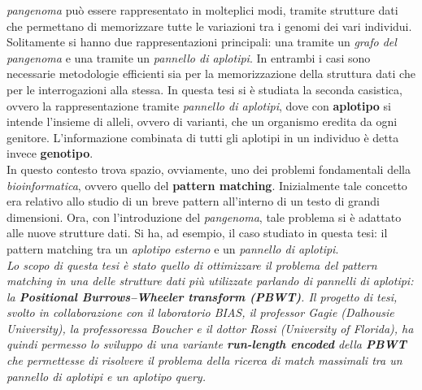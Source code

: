 \documentclass[a4paper,11pt, oneside]{article}
\begin{document}
\textit{pangenoma} può essere rappresentato in molteplici modi, tramite
strutture dati che permettano di memorizzare tutte le variazioni tra i genomi
dei vari individui. Solitamente si hanno due rappresentazioni principali: una
tramite un \textit{grafo del pangenoma} e una tramite un \textit{pannello di
  aplotipi}. In entrambi i casi sono necessarie metodologie efficienti sia per
la memorizzazione della struttura dati che per le interrogazioni alla stessa. In
questa tesi si è studiata la seconda casistica, ovvero la rappresentazione
tramite \textit{pannello di aplotipi}, dove con \textbf{aplotipo} si intende
l'insieme di alleli, ovvero di varianti, che un organismo eredita da ogni
genitore. L'informazione combinata di tutti gli aplotipi in un individuo è detta
invece \textbf{genotipo}.\\
In questo contesto trova spazio, ovviamente, uno dei problemi fondamentali
della \textit{bioinformatica}, ovvero quello del \textbf{pattern
  matching}. Inizialmente tale concetto era relativo allo studio di un breve
pattern all'interno di un testo di grandi dimensioni. Ora, con l'introduzione
del \textit{pangenoma}, tale problema si è adattato alle nuove strutture
dati. Si ha, ad esempio, il caso studiato in questa tesi: il pattern matching
tra un \textit{aplotipo esterno} e un \textit{pannello di aplotipi}.\\
\textit{Lo scopo di questa tesi è stato quello di ottimizzare il problema del
  pattern 
matching in una delle strutture dati più utilizzate parlando di pannelli di
aplotipi: la \textbf{Positional Burrows–Wheeler transform (\textit{PBWT})}. Il
progetto di tesi, svolto in collaborazione con il laboratorio BIAS, il professor
Gagie (Dalhousie University), la professoressa Boucher e il dottor Rossi
(University of Florida), ha quindi permesso lo sviluppo di una variante
\textbf{run-length encoded} della \textbf{PBWT} che permettesse di risolvere il
problema della ricerca di match massimali tra un pannello di aplotipi e un
aplotipo query.}
\end{document}
